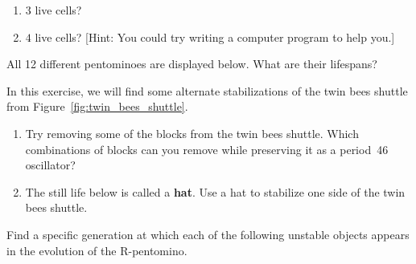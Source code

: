\begin{multicols}{2}
\begin{problem}
\begin{enumerate}[label=\bf\color{ocre}(\alph*)]
			\item {} $3$ live cells?
			
			\item {} $4$ live cells? [Hint: You could try writing a computer program to help you.]
		\end{enumerate}
	\end{problem}
	
	
	\mfilbreak
	
	
	\begin{problem}\label{exer:pentominoes} 
		All 12 different pentominoes are displayed below. What are their lifespans?
		
		\begin{center}
		\end{center}
	\end{problem}
	
	
	\mfilbreak
	
	
	\begin{problem}\label{exer:twin_bees_stabilize}
		In this exercise, we will find some alternate stabilizations of the twin bees shuttle from Figure~\ref{fig:twin_bees_shuttle}.\smallskip
		
		\begin{enumerate}[label=\bf\color{ocre}(\alph*)]
			\item {} Try removing some of the blocks from the twin bees shuttle. Which combinations of blocks can you remove while preserving it as a period~46 oscillator?
			
			\item {} The still life below is called a \textbf{hat}. Use a hat to stabilize one side of the twin bees shuttle.
			\begin{center}
			\end{center}
		\end{enumerate}
	\end{problem}
	
	
	\mfilbreak
	
	
	\begin{problemstar}\label{exer:find_unstable} 
		Find a specific generation at which each of the following unstable objects appears in the evolution of the R-pentomino.\smallskip
		

\end{problemstar}
\end{multicols}
